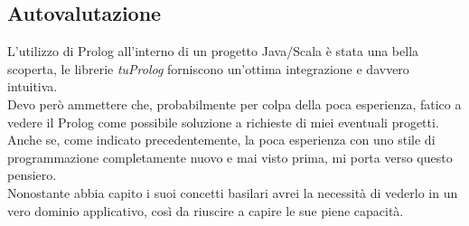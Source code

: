 \documentclass[10pt,english]{article}
\begin{document}
\subsection{Autovalutazione}
L'utilizzo di Prolog all'interno di un progetto Java/Scala è stata una bella scoperta, le librerie \textit{tuProlog} forniscono un'ottima integrazione e davvero intuitiva. \\
Devo però ammettere che, probabilmente per colpa della poca esperienza, fatico a vedere il Prolog come possibile soluzione a richieste di miei eventuali progetti. 
\\
Anche se, come indicato precedentemente, la poca esperienza con uno stile di programmazione completamente nuovo e mai visto prima, mi porta verso questo pensiero. \\
Nonostante abbia capito i suoi concetti basilari avrei la necessità di vederlo in un vero dominio applicativo, così da riuscire a capire le sue piene capacità. 


 
\end{document}
